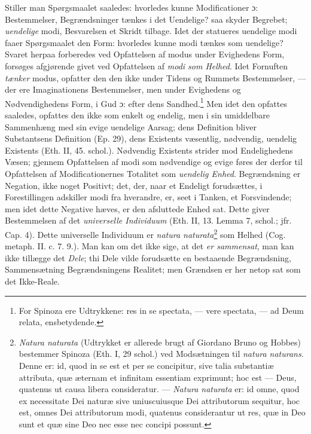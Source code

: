 \documentclass[12pt,a4paper]{book}
\newcommand{\opage}[1]{\marginnote{\footnotesize\textit{[#1]}}}
\begin{document}
Stiller man Spørgsmaalet saaledes: hvorledes kunne Modificationer ɔ:
Bestemmelser, Begrændsninger tænkes i det Uendelige? saa skyder
Begrebet; \emph{uendelige} modi, Besvarelsen et Skridt tilbage. Idet
der statueres uendelige modi faaer Spørgsmaalet den Form: hvorledes
kunne modi tænkes som uendelige? Svaret herpaa forberedes ved
Opfattelsen af modus under Evighedens Form, forsøges afgjørende givet
ved Opfattelsen af \emph{modi som Helhed}. Idet Fornuften
\emph{tænker} modus, opfatter den den ikke under Tidens og Rummets
Bestemmelser, --- der ere Imaginationens Bestemmelser, men under
Evighedens og Nødvendighedens Form, i Gud ɔ: efter dens
Sandhed.\footnote{For Spinoza ere Udtrykkene: res in se spectata, ---
vere spectata, --- ad Deum relata, ensbetydende.} Men idet den
opfattes saaledes, opfattes den ikke som enkelt og endelig, men i sin
umiddelbare Sammenhæng med sin evige uendelige Aarsag; dens Definition
bliver Substantsens Definition (Ep. 29), dens Existents væsentlig,
nødvendig, uendelig Existents (Eth. II, 45. schol.). Nødvendig
Existents strider mod Endelighedens Væsen; gjennem Opfattelsen af
modi som nødvendige og evige føres der derfor til Opfattelsen af
Modificationernes Totalitet som \emph{uendelig Enhed}. Begrændsning
er Negation, ikke noget Positivt; det, der, naar et Endeligt
forudsættes, i Forestillingen adskiller modi fra hverandre, er, seet
i Tanken, et Forsvindende; men idet dette Negative hæves, er den
afsluttede Enhed sat. Dette
\opage{61} \setcounter{footnote}{0}%
giver Bestemmelsen af det \emph{universelle Individuum} (Eth. II, 13.
Lemma 7, schol.; jfr. Cap. 4). Dette universelle Individuum er
\emph{natura naturata}\footnote{\emph{Natura naturata} (Udtrykket er
allerede brugt af Giordano Bruno og Hobbes) bestemmer Spinoza (Eth. I,
29 schol.) ved Modsætningen til \emph{natura naturans}. Denne er: id,
quod in se est et per se concipitur, sive talia substantiæ attributa,
quæ æternam et infinitam essentiam exprimunt; hoc est --- Deus,
quatenus ut causa libera consideratur. --- \emph{Natura naturata} er:
id omne, quod ex necessitate Dei naturæ sive uniuscuiusque Dei
attributorum sequitur, hoc est, omnes Dei attributorum modi, quatenus
considerantur ut res, quæ in Deo sunt et quæ sine Deo nec esse nec
concipi possunt.} som Helhed (Cog. metaph. II. c. 7. 9.). Man kan om
det ikke sige, at det \emph{er sammensat}, man kan ikke tillægge det \emph{Dele};
thi Dele vilde forudsætte en bestaaende Begrændsning, Sammensætning
Begrændsningens Realitet; men Grændsen er her netop sat som det
Ikke-Reale.
\end{document}
